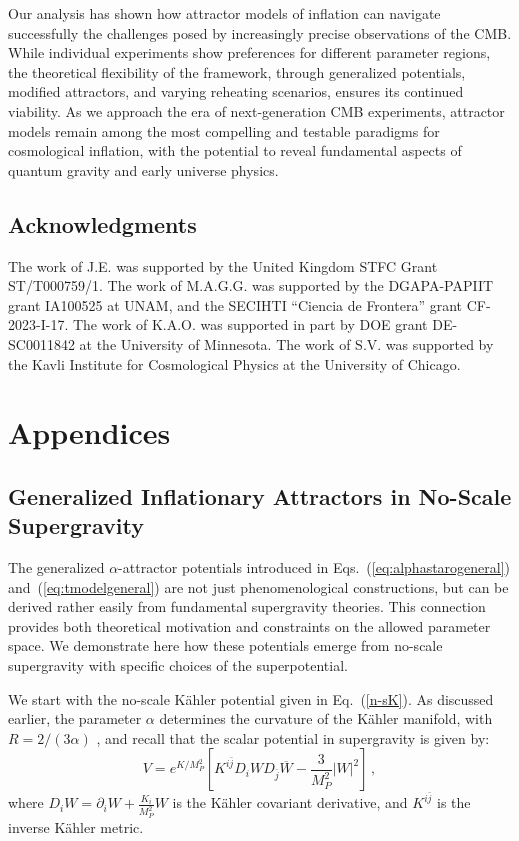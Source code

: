 \documentclass[aps,prev,twocolumn,preprintnumbers,floatfix,nofootinbib]{revtex4-1}
\begin{document}
Our analysis has shown how attractor models of inflation can navigate successfully the challenges posed by increasingly precise observations of the CMB. While individual experiments show preferences for different parameter regions, the theoretical flexibility of the framework, through generalized potentials, modified attractors, and varying reheating scenarios, ensures its continued viability. 
As we approach the era of next-generation CMB experiments, attractor models remain among the most compelling and testable paradigms for cosmological inflation, with the potential to reveal fundamental aspects of quantum gravity and early universe physics.


\subsection*{Acknowledgments}
The work of J.E. was supported by the United Kingdom STFC Grant ST/T000759/1. The work of M.A.G.G. was supported by the DGAPA-PAPIIT grant IA100525 at UNAM, and the SECIHTI ``Ciencia de Frontera” grant CF-2023-I-17. The work of K.A.O. was supported in part by DOE grant DE-SC0011842 at the University of Minnesota. The work of S.V. was supported by the Kavli Institute for Cosmological Physics at the University of Chicago.

\section*{Appendices}
\appendix

\renewcommand{\thesubsection}{\Alph{subsection}}
\setcounter{equation}{0}
\renewcommand{\theequation}{\thesubsection.\arabic{equation}}
\subsection{Generalized Inflationary Attractors in No-Scale Supergravity}
\label{appA}
\setcounter{equation}{0}


The generalized $\alpha$-attractor potentials introduced in Eqs.~(\ref{eq:alphastarogeneral}) and~(\ref{eq:tmodelgeneral}) are not just phenomenological constructions, but can be derived rather easily from fundamental supergravity theories. This connection provides both theoretical motivation and constraints on the allowed parameter space. We demonstrate here how these potentials emerge from no-scale supergravity \cite{no-scale,LN} with specific choices of the superpotential.

We start with the no-scale K\"ahler potential given in Eq.~(\ref{n-sK}).
As discussed earlier, the parameter $\alpha$ determines the curvature of the K\"ahler manifold, with $R = 2/(3\alpha)$ \cite{EKN1}, and recall that the scalar potential in supergravity is given by:
\begin{equation}
V = e^{K/M_P^2}\left[K^{i\bar{j}}D_iW D_{\bar{j}}\overline{W} - \frac{3}{M_P^2}|W|^2\right] \,,
\end{equation}
where $D_iW = \partial_iW + \frac{K_i}{M_P^2} W$ is the K\"ahler covariant derivative, and $K^{i\bar{j}}$ is the inverse K\"ahler metric.
\end{document}
